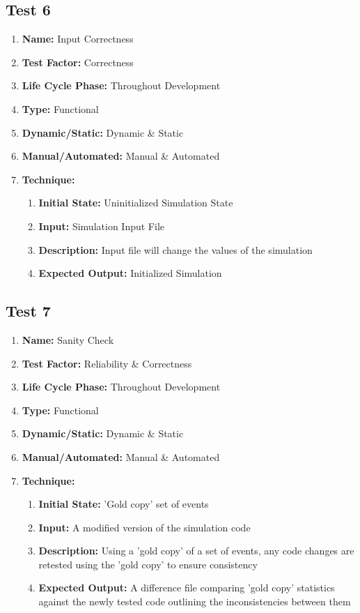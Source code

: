 \documentclass[paper=letter, fontsize=10pt]{scrartcl}
\numberwithin{equation}{section}		%
\numberwithin{figure}{section}			%
\numberwithin{table}{section}				%
\begin{document}
\subsection{Test 6}
\begin{enumerate}[a]
	\item \textbf{Name:} Input Correctness
	\item \textbf{Test Factor:} Correctness  
	\item \textbf{Life Cycle Phase:} Throughout Development
	\item \textbf{Type:} Functional
	\item \textbf{Dynamic/Static:} Dynamic \& Static
	\item \textbf{Manual/Automated:} Manual \& Automated
	\item \textbf{Technique:}
		\begin{enumerate}[i]
			\item \textbf{Initial State:} Uninitialized Simulation State  
			\item \textbf{Input:} Simulation Input File
			\item \textbf{Description:} Input file will change the values of the simulation
			\item \textbf{Expected Output:} Initialized Simulation
		\end{enumerate}
\end{enumerate}

\subsection{Test 7}
\begin{enumerate}[a]
	\item \textbf{Name:} Sanity Check
	\item \textbf{Test Factor:} Reliability \& Correctness 
	\item \textbf{Life Cycle Phase:} Throughout Development
	\item \textbf{Type:} Functional
	\item \textbf{Dynamic/Static:} Dynamic \& Static
	\item \textbf{Manual/Automated:} Manual \& Automated
	\item \textbf{Technique:}
		\begin{enumerate}[i]
			\item \textbf{Initial State:} 'Gold copy' set of events  
			\item \textbf{Input:} A modified version of the simulation code
			\item \textbf{Description:} Using a 'gold copy' of a set of events, any code changes are retested using the 'gold copy' to ensure consistency
			\item \textbf{Expected Output:} A difference file comparing 'gold copy' statistics against the newly tested code outlining the inconsistencies between them 
		\end{enumerate}
\end{enumerate}
\end{document}
